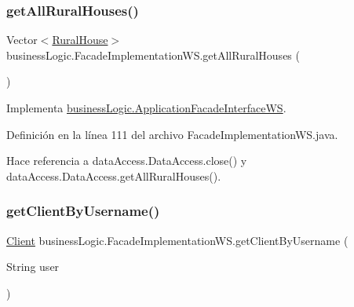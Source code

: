 \subsubsection{\texorpdfstring{getAllRuralHouses()}{getAllRuralHouses()}}
{\footnotesize\ttfamily Vector$<$\mbox{\hyperlink{classdomain_1_1_rural_house}{Rural\+House}}$>$ business\+Logic.\+Facade\+Implementation\+W\+S.\+get\+All\+Rural\+Houses (\begin{DoxyParamCaption}{ }\end{DoxyParamCaption})}



Implementa \mbox{\hyperlink{interfacebusiness_logic_1_1_application_facade_interface_w_s_a553cbfb37ea9f1621ba76ad8308a15da}{business\+Logic.\+Application\+Facade\+Interface\+WS}}.



Definición en la línea 111 del archivo Facade\+Implementation\+W\+S.\+java.


\begin{DoxyCode}{0}

\end{DoxyCode}


Hace referencia a data\+Access.\+Data\+Access.\+close() y data\+Access.\+Data\+Access.\+get\+All\+Rural\+Houses().

\mbox{\label{classbusiness_logic_1_1_facade_implementation_w_s_a49e8bd0f75fee0f774c78f1631509a12}} 
\subsubsection{\texorpdfstring{getClientByUsername()}{getClientByUsername()}}
{\footnotesize\ttfamily \mbox{\hyperlink{classdomain_1_1_client}{Client}} business\+Logic.\+Facade\+Implementation\+W\+S.\+get\+Client\+By\+Username (\begin{DoxyParamCaption}\item[{String}]{user }\end{DoxyParamCaption})}



